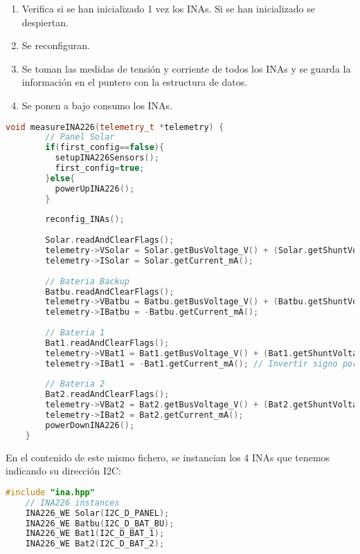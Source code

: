 \begin{enumerate}
    \item Verifica si se han inicializado 1 vez los INAs. Si se han inicializado se despiertan.
    \item Se reconfiguran.
    \item Se toman las medidas de tensión y corriente de todos los INAs y se guarda la información en el puntero con la estructura de datos.
    \item Se ponen a bajo consumo los INAs.
\end{enumerate}

\begin{lstlisting}[captionpos=b, caption={Codigo funcion measureINA226}, language=c++]
    void measureINA226(telemetry_t *telemetry) {
        // Panel Solar
        if(first_config==false){
          setupINA226Sensors();
          first_config=true;
        }else{
          powerUpINA226();  
        }
    
        reconfig_INAs();
        
        Solar.readAndClearFlags();
        telemetry->VSolar = Solar.getBusVoltage_V() + (Solar.getShuntVoltage_mV() / 100);
        telemetry->ISolar = Solar.getCurrent_mA();
    
        // Bateria Backup
        Batbu.readAndClearFlags();
        telemetry->VBatbu = Batbu.getBusVoltage_V() + (Batbu.getShuntVoltage_mV() / 100);
        telemetry->IBatbu = -Batbu.getCurrent_mA();
    
        // Bateria 1
        Bat1.readAndClearFlags();
        telemetry->VBat1 = Bat1.getBusVoltage_V() + (Bat1.getShuntVoltage_mV() / 100);
        telemetry->IBat1 = -Bat1.getCurrent_mA(); // Invertir signo porque esta al reves
    
        // Bateria 2
        Bat2.readAndClearFlags();
        telemetry->VBat2 = Bat2.getBusVoltage_V() + (Bat2.getShuntVoltage_mV() / 100);
        telemetry->IBat2 = Bat2.getCurrent_mA();
        powerDownINA226();
    }
\end{lstlisting}


En el contenido de este mismo fichero, se instancian los 4 INAs que tenemos indicando su dirección I2C:

\begin{lstlisting}[captionpos=b, caption={Instancia de las direcciones de los INAs.}, language=c++]
    #include "ina.hpp"
    // INA226 instances
    INA226_WE Solar(I2C_D_PANEL);
    INA226_WE Batbu(I2C_D_BAT_BU);
    INA226_WE Bat1(I2C_D_BAT_1);
    INA226_WE Bat2(I2C_D_BAT_2);
    
\end{lstlisting}

